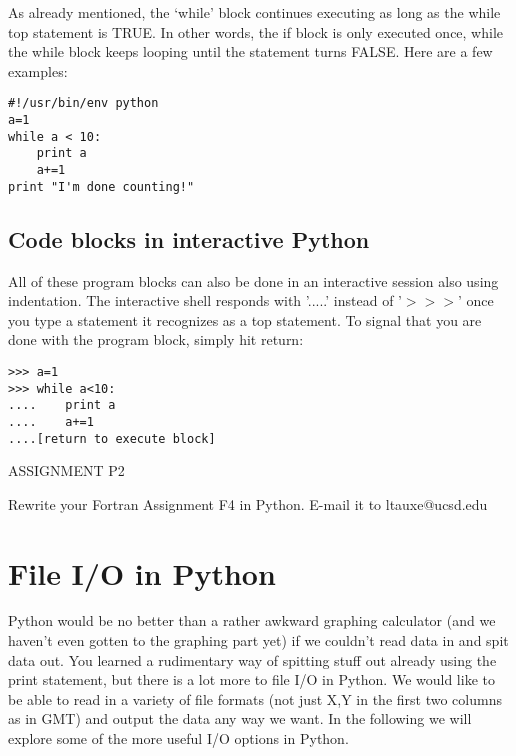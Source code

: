 {As already mentioned, the `while' block  continues executing as long as the {\color{blue}while}  top statement is TRUE.  In other words, the if block is only executed once, while the {\color{blue}while}  block keeps looping until the statement turns FALSE.    Here are a few examples:


{\singlespacing \color{blue} \begin{verbatim}
#!/usr/bin/env python
a=1
while a < 10:
    print a
    a+=1
print "I'm done counting!"
\end{verbatim}}

\subsection{Code blocks in interactive Python}

All of these program blocks can also be done in an interactive session also using indentation.  The interactive shell responds with '.....'  instead of '$>>>$' once you type a statement it recognizes as a top statement.   To signal that you are done with the program block, simply hit return: 


{\singlespacing \color{blue} \begin{verbatim}
>>> a=1
>>> while a<10:
....    print a
....    a+=1
....[return to execute block]
\end{verbatim}}



\noindent
{\singlespacing \color{red} ASSIGNMENT  P2

Rewrite your Fortran Assignment F4 in Python. E-mail it to ltauxe@ucsd.edu}




\section{File I/O in Python}

Python would be no better than a rather awkward graphing calculator (and we haven't even gotten to the graphing part yet) if we couldn't read data in and spit data out.   You learned a rudimentary way of spitting stuff out already using the {\color{blue}print} statement, but there is a lot more to file I/O in Python.  We would like to be able to read in a variety of file formats (not just X,Y in the first two columns as in GMT) and output the data any way we want.  In the following we will explore some of the more useful  I/O options in Python.  




}
